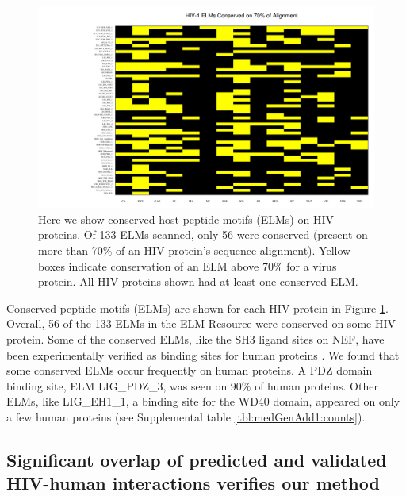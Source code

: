 \begin{figure}
\begin{center}
\includegraphics[scale=2]{figs/medGen_2}
\end{center}
\caption[Host peptide motifs conserved on HIV proteins]{\small Here we
  show conserved host peptide motifs (ELMs) on HIV proteins. Of 133
  ELMs scanned, only 56 were conserved (present on more than 70\% of
  an HIV protein's sequence alignment). Yellow boxes indicate
  conservation of an ELM above 70\% for a virus protein. All HIV
  proteins shown had at least one conserved
  ELM. \label{fig:medGen:fig2}}
\end{figure}

Conserved peptide motifs (ELMs) are shown for each HIV protein in
Figure \ref{fig:medGen:fig2}. Overall, 56 of the 133 ELMs in the ELM
Resource were conserved on some HIV protein. Some of the conserved
ELMs, like the SH3 ligand sites on NEF, have been experimentally
verified as binding sites for human proteins \cite{coleman06}. We
found that some conserved ELMs occur frequently on human proteins. A
PDZ domain binding site, ELM LIG\_PDZ\_3, was seen on 90\% of human
proteins. Other ELMs, like LIG\_EH1\_1, a binding site for the WD40
domain, appeared on only a few human proteins (see Supplemental table
\ref{tbl:medGenAdd1:counts}).


\subsection{Significant overlap of predicted and validated HIV-human interactions verifies our method}


